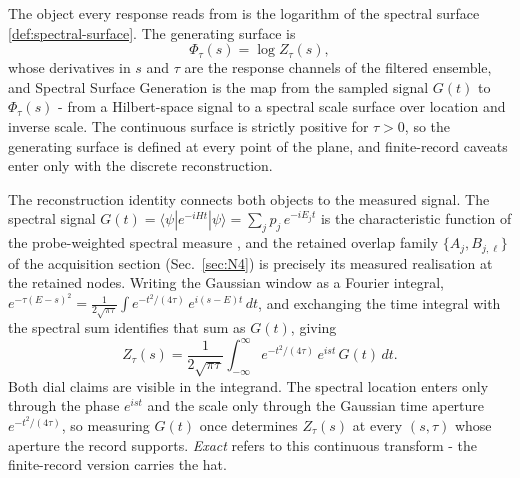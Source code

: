 The object every response reads from is the logarithm of the spectral surface \eqref{def:spectral-surface}. The generating surface is
\begin{equation}\label{def:generating-surface}
\Phi_\tau(s)=\log Z_\tau(s),
\end{equation}
whose derivatives in $s$ and $\tau$ are the response channels of the filtered ensemble, and Spectral Surface Generation is the map from the sampled signal $G(t)$ to $\Phi_\tau(s)$ - from a Hilbert-space signal to a spectral scale surface over location and inverse scale. The continuous surface is strictly positive for $\tau>0$, so the generating surface is defined at every point of the plane, and finite-record caveats enter only with the discrete reconstruction.

The reconstruction identity connects both objects to the measured signal. The spectral signal $G(t)=\langle\psi|e^{-iHt}|\psi\rangle=\sum_j p_j\,e^{-iE_j t}$ is the characteristic function of the probe-weighted spectral measure \cite{mccaul2025snacks}, and the retained overlap family $\{A_j, B_{j,\ell}\}$ of the acquisition section (Sec.~\ref{sec:N4}) is precisely its measured realisation at the retained nodes. Writing the Gaussian window as a Fourier integral, $e^{-\tau(E-s)^{2}}=\tfrac{1}{2\sqrt{\pi\tau}}\int e^{-t^{2}/(4\tau)}\,e^{i(s-E)t}\,dt$, and exchanging the time integral with the spectral sum identifies that sum as $G(t)$, giving
\begin{equation}\label{thm:fourier-reconstruction-identity}
Z_\tau(s)=\frac{1}{2\sqrt{\pi\tau}}\int_{-\infty}^{\infty}e^{-t^{2}/(4\tau)}\,e^{ist}\,G(t)\,dt.
\end{equation}
Both dial claims are visible in the integrand. The spectral location enters only through the phase $e^{ist}$ and the scale only through the Gaussian time aperture $e^{-t^{2}/(4\tau)}$, so measuring $G(t)$ once determines $Z_\tau(s)$ at every $(s,\tau)$ whose aperture the record supports. \emph{Exact} refers to this continuous transform - the finite-record version carries the hat.

